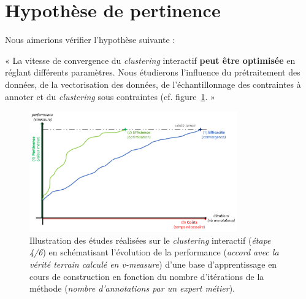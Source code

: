 \section{Hypothèse de pertinence}
\label{section:4.4-HYPOTHESE-PERTINENCE}

	Nous aimerions vérifier l'hypothèse suivante :

	\begin{tcolorbox}[
		title=\faVial~\textbf{Hypothèse de pertinence}~\faVial,
		colback=colorTcolorboxHypothesis!15,  %
		colframe=colorTcolorboxHypothesis!75,  %
		width=\linewidth
	]
		« La vitesse de convergence du \textit{clustering} interactif \textbf{peut être optimisée} en réglant différents paramètres. Nous étudierons l'influence du prétraitement des données, de la vectorisation des données, de l'échantillonnage des contraintes à annoter et du \textit{clustering} sous contraintes (cf. figure~\ref{figure:4.4-HYPOTHESE-PERTINENCE}. »
		
		
		\begin{figure}[H]  %
			\centering
			\includegraphics[width=0.8\textwidth]{figures/hypotheses-04-pertinence}
			\caption{Illustration des études réalisées sur le \textit{clustering} interactif (\textit{étape 4/6}) en schématisant l'évolution de la performance (\textit{accord avec la vérité terrain calculé en v-measure}) d'une base d'apprentissage en cours de construction en fonction du nombre d'itérations de la méthode (\textit{nombre d'annotations par un expert métier}).}
			\label{figure:4.4-HYPOTHESE-PERTINENCE}
		\end{figure}

	\end{tcolorbox}
	
